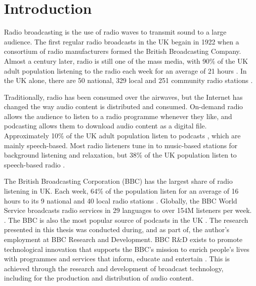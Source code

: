 \chapter{Introduction}\label{chp:intro}

Radio broadcasting is the use of radio waves to transmit sound to a large audience.  The first regular radio broadcasts
in the UK begain in 1922 when a consortium of radio manufacturers formed the British Broadcasting Company.
Almost a century later, radio is still one of the mass media, with 90\% of the UK adult population listening to the
radio each week for an average of 21 hours \citep{RAJAR2017a}.  In the UK alone, there are 50 national, 329 local and
251 community radio stations \citep[pp. 6, 127]{Ofcom2017}.

Traditionally, radio has been consumed over the airwaves, but the Internet has changed the way audio content is
distributed and consumed.  On-demand radio allows the audience to listen to a radio programme whenever they like, and
podcasting allows them to download audio content as a digital file.  Approximately 10\% of the UK adult population
listen to podcasts \citep{RAJAR2017}, which are mainly speech-based.  Most radio listeners tune in to music-based
stations for background listening and relaxation, but 38\% of the UK population listen to speech-based radio
\citep[pp.  97, 105]{Ofcom2017}.

The British Broadcasting Corporation (BBC) has the largest share of radio listening in UK. Each week, 64\% of the
population listen for an average of 16 hours to its 9 national and 40 local radio stations \citep{RAJAR2017a}.
Globally, the BBC World Service broadcasts radio services in 29 languages to over 154M listeners per week. 
\citep{BBC2017a}. The BBC is also the most popular source of podcasts in the UK \citep[p. 107]{Ofcom2017}.
The research presented in this thesis was conducted during, and as part of, the author's employment at BBC Research and
Development.  BBC R\&D exists to promote technological innovation that supports the BBC's mission to enrich people's
lives with programmes and services that inform, educate and entertain \citep[art. 15]{BBCCharter2016}.  This is
achieved through the research and development of broadcast technology, including for the production and distribution of
audio content.

